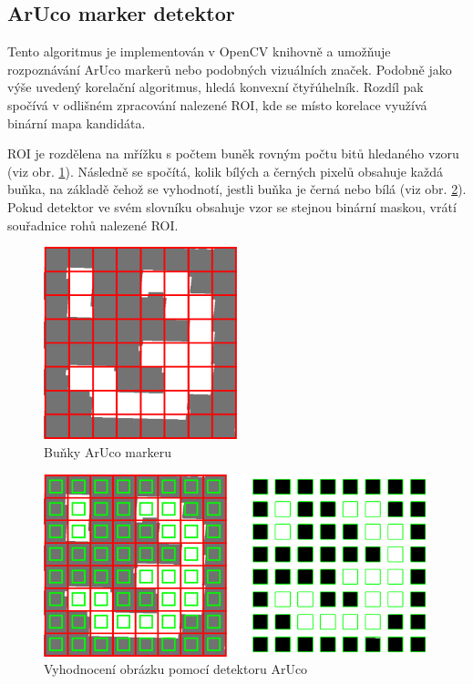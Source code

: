 \documentclass[twoside]{ctuthesis}
\theoremstyle{plain}
\theoremstyle{definition}
\theoremstyle{note}
\begin{document}
\subsection{ArUco marker detektor}
\label{aruco_marker}

Tento algoritmus je implementován v OpenCV knihovně a umožňuje rozpoznávání ArUco markerů nebo podobných vizuálních značek. Podobně jako výše uvedený korelační algoritmus, hledá konvexní čtyřúhelník. Rozdíl pak spočívá v odlišném zpracování nalezené ROI, kde se místo korelace využívá binární mapa kandidáta.

ROI je rozdělena na mřížku s počtem buněk rovným počtu bitů hledaného vzoru (viz obr. \ref{cell}). Následně se spočítá, kolik bílých a černých pixelů obsahuje každá buňka, na základě čehož se vyhodnotí, jestli buňka je černá nebo bílá (viz obr. \ref{cellm}). Pokud detektor ve svém slovníku obsahuje vzor se stejnou binární maskou, vrátí souřadnice rohů nalezené ROI.

\begin{figure}
	\caption{Buňky ArUco markeru}

	\label{cell}
	\includegraphics[width=0.5\textwidth]{images/2/bitsextraction1.png}
\end{figure}
\begin{figure}
	\caption{Vyhodnocení obrázku pomocí detektoru ArUco}

	\label{cellm}
	\includegraphics[width=1\textwidth]{images/2/bitsextraction2.png}
\end{figure}
\end{document}
